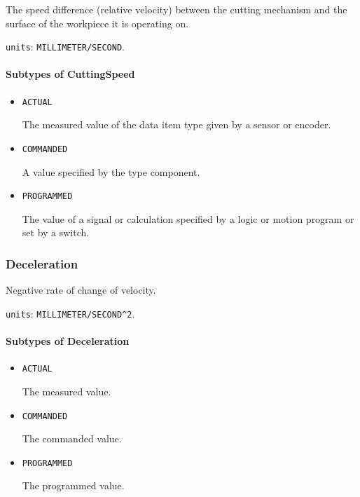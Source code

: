 The speed difference (relative velocity) between the cutting mechanism and the surface of the workpiece it is operating on.


\texttt{units}: \texttt{MILLIMETER/SECOND}.

\paragraph{Subtypes of CuttingSpeed}\mbox{}
\label{sec:Subtypes of CuttingSpeed}

\begin{itemize}

\item \texttt{ACTUAL}


The measured value of the data item type given by a sensor or encoder.

\item \texttt{COMMANDED}


A value specified by the  type component.

\item \texttt{PROGRAMMED}


The value of a signal or calculation specified by a logic or motion program or set by a switch.


\end{itemize}






\subsubsection{Deceleration}
\label{sec:Deceleration}



Negative rate of change of velocity.


\texttt{units}: \texttt{MILLIMETER/SECOND\^{}2}.

\paragraph{Subtypes of Deceleration}\mbox{}
\label{sec:Subtypes of Deceleration}

\begin{itemize}

\item \texttt{ACTUAL}


The measured value.

\item \texttt{COMMANDED}


The commanded value.

\item \texttt{PROGRAMMED}


The programmed value.


\end{itemize}






